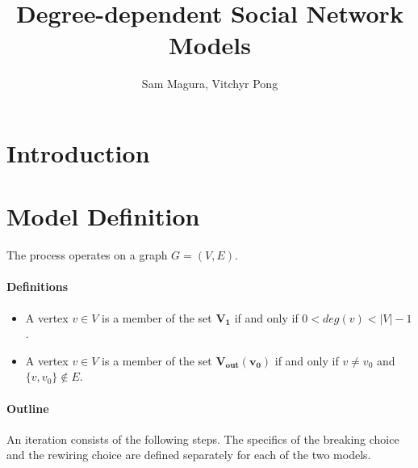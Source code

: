 \documentclass[a4paper,10pt]{article}
\title{Degree-dependent Social Network Models}
\author{Sam Magura, Vitchyr Pong}
\begin{document}
\maketitle

\section{Introduction}


\section{Model Definition}

The process operates on a graph $G = (V, E)$.

\paragraph{Definitions}
\begin{itemize}
 \item A vertex $v \in V$ is a member of the set $\mathbf{V_1}$ if and only if $0 < deg(v) < |V| - 1$.
 \item A vertex $v \in V$ is a member of the set $\mathbf{V_{out}(v_0)}$ if and only if $v \neq v_0$ and $\{v, v_0\} \notin E$. 
\end{itemize}

\paragraph{Outline} An iteration consists of the following steps. The specifics of the breaking choice and the rewiring choice are defined separately for each of the two models.
\end{document}
